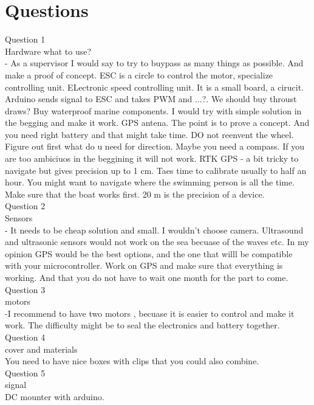 \documentclass{article}[10pt]
\begin{document}
\section{Questions}
Question 1\\
Hardware what to use? \\
- As a supervisor I would say to try to buypass as many things as possible. And make a proof of concept. ESC is a circle to control the motor, specialize controlling unit. ELectronic speed controlling unit.
It is a small board, a cirucit. Arduino sends signal to ESC and takes PWM and ...?. We should buy throust draws? 
Buy waterproof marine components. I would try with simple solution in the begging and make it work. GPS antena. 
The point is to prove a concept. And you need right battery and that might take time. DO not reenvent the wheel. Figure out first what do u need 
for direction. Maybe you need a compass. If you are too ambiciuos in the beggining it will not work. RTK GPS - a bit tricky to navigate but gives precision up to 1 cm. Taes time to calibrate 
usually to half an hour. You might want to navigate where the swimming person is all the time. Make sure that the boat works first. 
20 m is the precision of a device. \\
Question 2\\
Sensors\\
- It needs to be cheap solution and small. I wouldn't choose camera. Ultrasound and ultrasonic sensors would not work on the sea becuase of the waves etc. 
In my opinion GPS would be the best options, and the one that willl be compatible with your microcontroller. Work on GPS and make sure that everything is working. 
And that you do not have to wait one month for the part to come. \\
Question 3\\
motors\\
-I recommend to have two motors , becuase it is easier to control and make it work. The difficulty might be to seal the electronics and battery together. \\
Question 4\\
cover and materials\\
You need to have nice boxes with clips that you could also combine. \\
Question 5\\
signal\\
DC mounter with arduino. 
\end{document}
